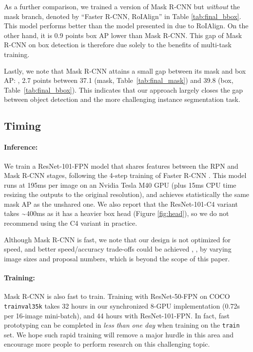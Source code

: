 \documentclass[10pt,twocolumn,letterpaper]{article}
\newcommand{\app}{\raise.17ex\hbox{$\scriptstyle\sim$}}
\begin{document}
As a further comparison, we trained a version of Mask R-CNN but \emph{without} the mask branch, denoted by ``Faster R-CNN, RoIAlign'' in Table \ref{tab:final_bbox}. This model performs better than the model presented in \cite{Lin2017} due to RoIAlign. On the other hand, it is 0.9 points box AP lower than Mask R-CNN. This gap of Mask R-CNN on box detection is therefore due solely to the benefits of multi-task training.

Lastly, we note that Mask R-CNN attains a small gap between its mask and box AP: \eg, 2.7 points between 37.1 (mask, Table~\ref{tab:final_mask}) and 39.8 (box, Table~\ref{tab:final_bbox}). This indicates that our approach largely closes the gap between object detection and the more challenging instance segmentation task.

\subsection{Timing}

\paragraph{Inference:} We train a ResNet-101-FPN model that shares features between the RPN and Mask R-CNN stages, following the 4-step training of Faster R-CNN \cite{Ren2015a}. This model runs at 195ms per image on an Nvidia Tesla M40 GPU (plus 15ms CPU time resizing the outputs to the original resolution), and achieves statistically the same mask AP as the unshared one. We also report that the ResNet-101-C4 variant takes $\app$400ms as it has a heavier box head (Figure \ref{fig:head}), so we do not recommend using the C4 variant in practice.

Although Mask R-CNN is fast, we note that our design is not optimized for speed, and better speed/accuracy trade-offs could be achieved \cite{Huang2017}, \eg, by varying image sizes and proposal numbers, which is beyond the scope of this paper.

\paragraph{Training:} Mask R-CNN is also fast to train. Training with ResNet-50-FPN on COCO \texttt{trainval35k} takes 32 hours in our synchronized 8-GPU implementation (0.72s per 16-image mini-batch), and 44 hours with ResNet-101-FPN. In fact, fast prototyping can be completed in \emph{less than one day} when training on the \texttt{train} set. We hope such rapid training will remove a major hurdle in this area and encourage more people to perform research on this challenging topic.
\end{document}

